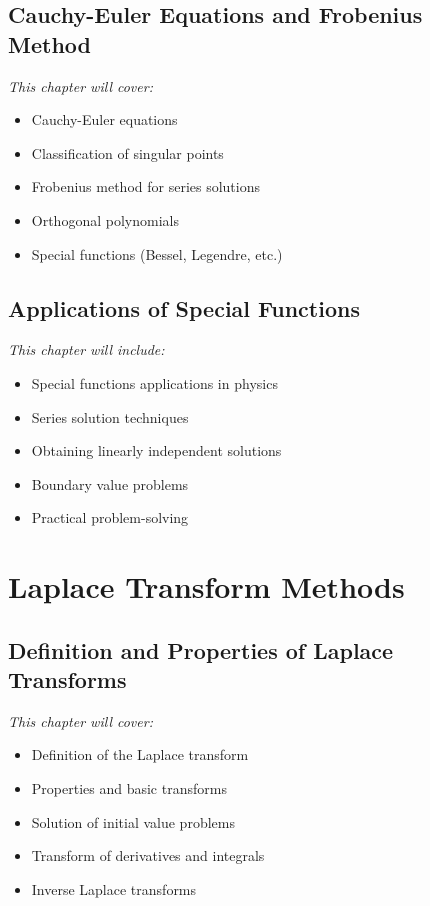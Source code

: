 \documentclass[12pt, letterpaper]{book}
\begin{document}
\chapter{Cauchy-Euler Equations and Frobenius Method}
\label{chap:session_9}

\textit{This chapter will cover:}
\begin{itemize}
    \item Cauchy-Euler equations
    \item Classification of singular points
    \item Frobenius method for series solutions
    \item Orthogonal polynomials
    \item Special functions (Bessel, Legendre, etc.)
\end{itemize}

\chapter{Applications of Special Functions}
\label{chap:session_10}

\textit{This chapter will include:}
\begin{itemize}
    \item Special functions applications in physics
    \item Series solution techniques
    \item Obtaining linearly independent solutions
    \item Boundary value problems
    \item Practical problem-solving
\end{itemize}

\part{Laplace Transform Methods}
\label{part:laplace_transforms}

\chapter{Definition and Properties of Laplace Transforms}
\label{chap:session_11}

\textit{This chapter will cover:}
\begin{itemize}
    \item Definition of the Laplace transform
    \item Properties and basic transforms
    \item Solution of initial value problems
    \item Transform of derivatives and integrals
    \item Inverse Laplace transforms
\end{itemize}
\end{document}
